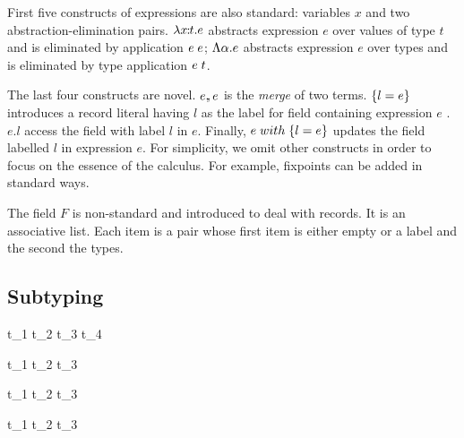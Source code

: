 First five constructs of expressions are also standard: variables $ x $ and two
abstraction-elimination pairs. $ \lambda x \!\!:\!\! t. e $ abstracts expression
$ e $ over values of type $ t $ and is eliminated by application $ e \; e $;
$ \Lambda \alpha. e $ abstracts expression $ e $ over types and is eliminated by
type application $ e \; t $.

The last four constructs are novel. $ e ,\!\!, e $ is the \emph{merge} of two
terms. $ \{ l = e \} $ introduces a record literal having $ l $ as the
label for field containing expression $ e $ . $ e.l $ access the field with
label $ l $ in $ e $. Finally, $ e \; with \; \{ l = e \} $ updates the field
labelled $ l $ in expression $ e $. For simplicity, we omit other constructs in
order to focus on the essence of the calculus. For example, fixpoints can be
added in standard ways.

The field $ F $ is non-standard and introduced to deal with records. It is an
associative list. Each item is a pair whose first item is either empty or a
label and the second the types.




\subsection{Subtyping}


\infax[S-Var]
{\alpha \subtype \alpha}

{t_1 \to t_2 \subtype t_3 \to t_4}

{ \subtype {}}

{t_1 \with t_2 \subtype t_3}

{t_1 \with t_2 \subtype t_3}

{t_1 \subtype t_2 \with t_3}

